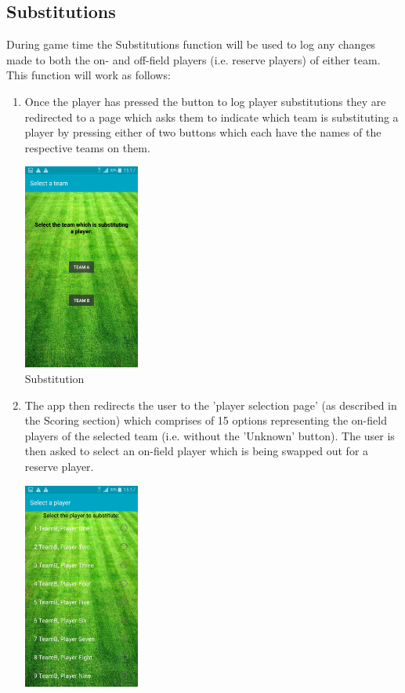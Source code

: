 \documentclass[hidelinks,a4paper,12pt]{article}
\begin{document}
	\subsection{Substitutions}
		During game time the Substitutions function will be used to log any changes made to both the on- and off-field players (i.e. reserve players) of either team. This function will work as follows:
		\begin{enumerate}
			\item Once the player has pressed the button to log player substitutions they are redirected to a page which asks them to indicate which team is substituting a player by pressing either of two buttons which each have the names of the respective teams on them.
			\begin{center}
  				 \includegraphics[width=0.3\textwidth] {./images/choose_substitute.png}\\[0.4cm]
  				 \caption{Substitution}
			\end{center}
			\item The app then redirects the user to the 'player selection page' (as described in the Scoring section) which comprises of 15 options representing the on-field players of the selected team (i.e. without the 'Unknown' button). The user is then asked to select an on-field player which is being swapped out for a reserve player.
			\begin{center}
  				 \includegraphics[width=0.3\textwidth] {./images/choose_substitute_player.png}\\[0.4cm]

\end{center}
\end{enumerate}
\end{document}
